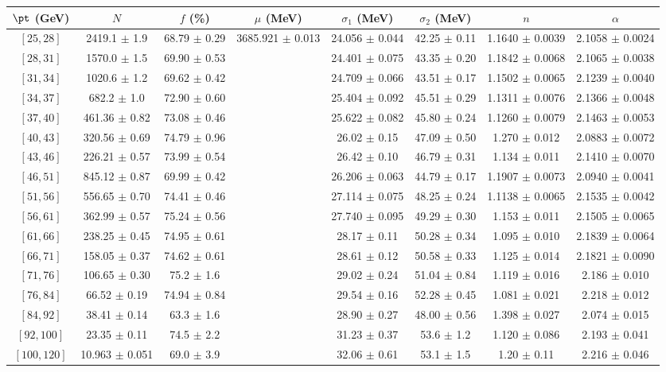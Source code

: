 \begin{tabular}{c||c|c|c|c|c|c|c}
$\pt$ (GeV) & $N$ & $f$ (\%) & $\mu$ (MeV) & $\sigma_1$ (MeV) & $\sigma_2$ (MeV) & $n$ & $\alpha$ \\
\hline
$[25, 28]$ & 2419.1 $\pm$ 1.9 & 68.79 $\pm$ 0.29 & \multirow{17}{*}{3685.921 $\pm$ 0.013} & 24.056 $\pm$ 0.044 & 42.25 $\pm$ 0.11 & 1.1640 $\pm$ 0.0039 & 2.1058 $\pm$ 0.0024\\
$[28, 31]$ & 1570.0 $\pm$ 1.5 & 69.90 $\pm$ 0.53 &  & 24.401 $\pm$ 0.075 & 43.35 $\pm$ 0.20 & 1.1842 $\pm$ 0.0068 & 2.1065 $\pm$ 0.0038\\
$[31, 34]$ & 1020.6 $\pm$ 1.2 & 69.62 $\pm$ 0.42 &  & 24.709 $\pm$ 0.066 & 43.51 $\pm$ 0.17 & 1.1502 $\pm$ 0.0065 & 2.1239 $\pm$ 0.0040\\
$[34, 37]$ & 682.2 $\pm$ 1.0 & 72.90 $\pm$ 0.60 &  & 25.404 $\pm$ 0.092 & 45.51 $\pm$ 0.29 & 1.1311 $\pm$ 0.0076 & 2.1366 $\pm$ 0.0048\\
$[37, 40]$ & 461.36 $\pm$ 0.82 & 73.08 $\pm$ 0.46 &  & 25.622 $\pm$ 0.082 & 45.80 $\pm$ 0.24 & 1.1260 $\pm$ 0.0079 & 2.1463 $\pm$ 0.0053\\
$[40, 43]$ & 320.56 $\pm$ 0.69 & 74.79 $\pm$ 0.96 &  & 26.02 $\pm$ 0.15 & 47.09 $\pm$ 0.50 & 1.270 $\pm$ 0.012 & 2.0883 $\pm$ 0.0072\\
$[43, 46]$ & 226.21 $\pm$ 0.57 & 73.99 $\pm$ 0.54 &  & 26.42 $\pm$ 0.10 & 46.79 $\pm$ 0.31 & 1.134 $\pm$ 0.011 & 2.1410 $\pm$ 0.0070\\
$[46, 51]$ & 845.12 $\pm$ 0.87 & 69.99 $\pm$ 0.42 &  & 26.206 $\pm$ 0.063 & 44.79 $\pm$ 0.17 & 1.1907 $\pm$ 0.0073 & 2.0940 $\pm$ 0.0041\\
$[51, 56]$ & 556.65 $\pm$ 0.70 & 74.41 $\pm$ 0.46 &  & 27.114 $\pm$ 0.075 & 48.25 $\pm$ 0.24 & 1.1138 $\pm$ 0.0065 & 2.1535 $\pm$ 0.0042\\
$[56, 61]$ & 362.99 $\pm$ 0.57 & 75.24 $\pm$ 0.56 &  & 27.740 $\pm$ 0.095 & 49.29 $\pm$ 0.30 & 1.153 $\pm$ 0.011 & 2.1505 $\pm$ 0.0065\\
$[61, 66]$ & 238.25 $\pm$ 0.45 & 74.95 $\pm$ 0.61 &  & 28.17 $\pm$ 0.11 & 50.28 $\pm$ 0.34 & 1.095 $\pm$ 0.010 & 2.1839 $\pm$ 0.0064\\
$[66, 71]$ & 158.05 $\pm$ 0.37 & 74.62 $\pm$ 0.61 &  & 28.61 $\pm$ 0.12 & 50.58 $\pm$ 0.33 & 1.125 $\pm$ 0.014 & 2.1821 $\pm$ 0.0090\\
$[71, 76]$ & 106.65 $\pm$ 0.30 & 75.2 $\pm$ 1.6 &  & 29.02 $\pm$ 0.24 & 51.04 $\pm$ 0.84 & 1.119 $\pm$ 0.016 & 2.186 $\pm$ 0.010\\
$[76, 84]$ & 66.52 $\pm$ 0.19 & 74.94 $\pm$ 0.84 &  & 29.54 $\pm$ 0.16 & 52.28 $\pm$ 0.45 & 1.081 $\pm$ 0.021 & 2.218 $\pm$ 0.012\\
$[84, 92]$ & 38.41 $\pm$ 0.14 & 63.3 $\pm$ 1.6 &  & 28.90 $\pm$ 0.27 & 48.00 $\pm$ 0.56 & 1.398 $\pm$ 0.027 & 2.074 $\pm$ 0.015\\
$[92, 100]$ & 23.35 $\pm$ 0.11 & 74.5 $\pm$ 2.2 &  & 31.23 $\pm$ 0.37 & 53.6 $\pm$ 1.2 & 1.120 $\pm$ 0.086 & 2.193 $\pm$ 0.041\\
$[100, 120]$ & 10.963 $\pm$ 0.051 & 69.0 $\pm$ 3.9 &  & 32.06 $\pm$ 0.61 & 53.1 $\pm$ 1.5 & 1.20 $\pm$ 0.11 & 2.216 $\pm$ 0.046\\
\end{tabular}
